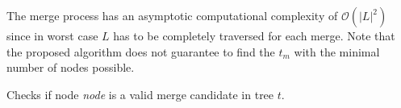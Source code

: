 The merge process has an asymptotic computational complexity of $\mathcal{O}(\vert L \vert^2)$ since in worst case $L$ has to be completely traversed for each merge.
Note that the proposed algorithm does not guarantee to find the $t_m$ with the minimal number of nodes possible. 

\begin{algorithm}[htb]

\nl	{}
\caption{Checks if node \textit{node} is a valid merge candidate in tree $t$.}\label{al:trav}
\end{algorithm}


